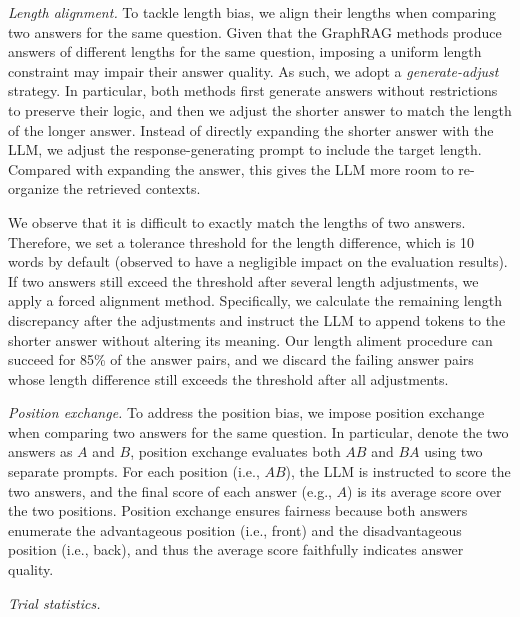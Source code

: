 \squishlist
    \item {\textit{Length alignment.}}
    To tackle length bias, we align their lengths when comparing two answers for the same question. Given that the GraphRAG methods produce answers of different lengths for the same question, imposing a uniform length constraint may impair their answer quality. As such, we adopt a \textit{generate-adjust} strategy. In particular, both methods first generate answers without restrictions to preserve their logic, and then we adjust the shorter answer to match the length of the longer answer. Instead of directly expanding the shorter answer with the LLM, we adjust the response-generating prompt to include the target length. Compared with expanding the answer, this gives the LLM more room to re-organize the retrieved contexts.

    We observe that it is difficult to exactly match the lengths of two answers. Therefore, we set a tolerance threshold for the length difference, which is 10 words by default (observed to have a negligible impact on the evaluation results). If two answers still exceed the threshold after several length adjustments, we apply a forced alignment method. Specifically, we calculate the remaining length discrepancy after the adjustments and instruct the LLM to append tokens to the shorter answer without altering its meaning. Our length aliment procedure can succeed for 85\% of the answer pairs, and we discard the failing answer pairs whose length difference still exceeds the threshold after all adjustments.
    \item {\textit{Position exchange.}}
    To address the position bias, we impose position exchange when comparing two answers for the same question. In particular, denote the two answers as $A$ and $B$, position exchange evaluates both $AB$ and $BA$ using two separate prompts. For each position (i.e., $AB$), the LLM is instructed to score the two answers, and the final score of each answer (e.g., $A$) is its average score over the two positions. Position exchange ensures fairness because both answers enumerate the advantageous position (i.e., front) and the disadvantageous position (i.e., back), and thus the average score faithfully indicates answer quality. 
    \item {\textit{Trial statistics.}}

